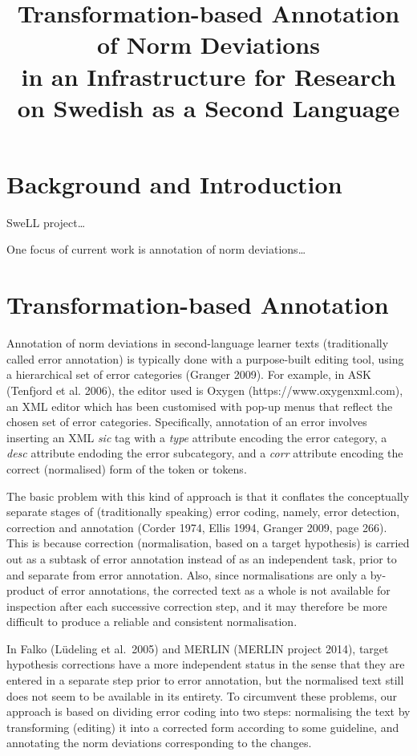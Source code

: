 \documentclass[10pt, a4paper]{article}
\title{Transformation-based Annotation of Norm Deviations \\ in an Infrastructure for Research on Swedish as a Second Language}
\begin{document}
\maketitleabstract

\section{Background and Introduction}

SweLL project\ldots

One focus of current work is annotation of norm deviations\ldots

\section{Transformation-based Annotation}

Annotation of norm deviations in second-language learner texts (traditionally called error annotation) is typically done with a purpose-built editing tool, using a hierarchical set of error categories (Granger 2009). For example, in ASK (Tenfjord et al. 2006), the editor used is Oxygen (https://www.oxygenxml.com), an XML editor which has been customised with pop-up menus that reflect the chosen set of error categories. Specifically, annotation of an error involves inserting an XML {\em sic} tag with a {\em type} attribute encoding the error category, a {\em desc} attribute endoding the error subcategory, and a {\em corr} attribute encoding the correct (normalised) form of the token or tokens.

The basic problem with this kind of approach is that it conflates the conceptually separate stages of (traditionally speaking) error coding, namely, error detection, correction and annotation (Corder 1974, Ellis 1994, Granger 2009, page 266). This is because correction (normalisation, based on a target hypothesis) is carried out as a subtask of error annotation instead of as an independent task, prior to and separate from error annotation. Also, since normalisations are only a by-product of error annotations, the corrected text as a whole is not available for inspection after each successive correction step, and it may therefore be more difficult to produce a reliable and consistent normalisation.

In Falko (L{\"u}deling et al.\ 2005) and MERLIN (MERLIN project 2014), target hypothesis corrections have a more independent status in the sense that they are entered in a separate step prior to error annotation, but the normalised text still does not seem to be available in its entirety. To circumvent these problems, our approach is based on dividing error coding into two steps: normalising the text by transforming (editing) it into a corrected form according to some guideline, and annotating the norm deviations corresponding to the changes.
\end{document}
